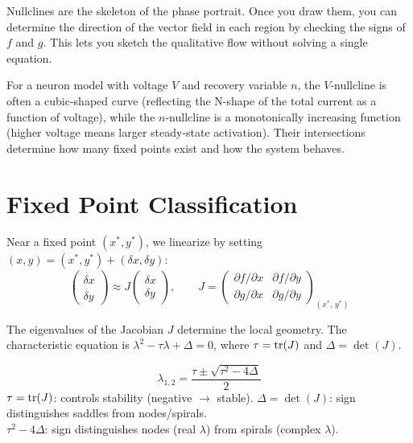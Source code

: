 Nullclines are the skeleton of the phase portrait. Once you draw them, you can determine the direction of the vector field in each region by checking the signs of $f$ and $g$. This lets you sketch the qualitative flow without solving a single equation.

For a neuron model with voltage $V$ and recovery variable $n$, the $V$-nullcline is often a cubic-shaped curve (reflecting the N-shape of the total current as a function of voltage), while the $n$-nullcline is a monotonically increasing function (higher voltage means larger steady-state activation). Their intersections determine how many fixed points exist and how the system behaves.

\section{Fixed Point Classification}
\label{sec:fp-classification}

Near a fixed point $(x^*, y^*)$, we linearize by setting $(x, y) = (x^*, y^*) + (\delta x, \delta y)$:
%
\begin{equation}
  \begin{pmatrix} \dot{\delta x} \\ \dot{\delta y} \end{pmatrix}
  \approx J \begin{pmatrix} \delta x \\ \delta y \end{pmatrix},
  \qquad
  J = \begin{pmatrix}
    \partial f/\partial x & \partial f/\partial y \\
    \partial g/\partial x & \partial g/\partial y
  \end{pmatrix}_{\!(x^*,\, y^*)}
  \label{eq:jacobian}
\end{equation}

The eigenvalues of the Jacobian $J$ determine the local geometry. The characteristic equation is $\lambda^2 - \tau\lambda + \Delta = 0$, where $\tau = \operatorname{tr}(J)$ and $\Delta = \det(J)$.

\begin{keyequation}
\begin{equation}
  \lambda_{1,2} = \frac{\tau \pm \sqrt{\tau^2 - 4\Delta}}{2}
  \label{eq:eigenvalues}
\end{equation}
\tcblower
$\tau = \operatorname{tr}(J)$: controls stability (negative $\to$ stable). \quad
$\Delta = \det(J)$: sign distinguishes saddles from nodes/spirals. \\[4pt]
$\tau^2 - 4\Delta$: sign distinguishes nodes (real $\lambda$) from spirals (complex $\lambda$).
\end{keyequation}

